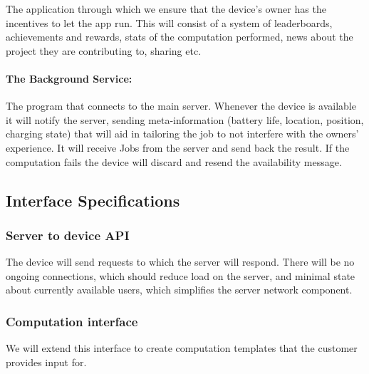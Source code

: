 \documentclass[a4paper,10pt]{article}
\begin{document}
The application through which we ensure that the device's owner has the incentives to let the app run. This will consist of a system of leaderboards, achievements and rewards, stats of the  computation performed, news about the project they are contributing to, sharing etc.

\paragraph{The Background Service:} 
The program that connects to the main server. Whenever the device is available it will notify the server, sending meta-information (battery life, location, position, charging state) that will aid in tailoring the job to not interfere with the owners' experience. It will receive Jobs from the server and send back the result. If the computation fails the device will discard and resend the availability message.



\subsection{Interface Specifications}


\subsubsection{Server to device API}

The device will send requests to which the server will respond.
There will be no ongoing connections, which should reduce load on the server, and minimal state about currently available users, which simplifies the server network component.



\newpage
\subsubsection{Computation interface}

We will extend this interface to create computation templates that the customer provides input for.

\newpage



\end{document}
